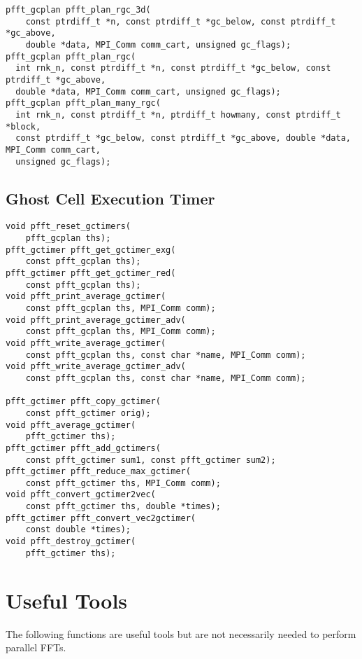 \begin{lstlisting}
pfft_gcplan pfft_plan_rgc_3d(
    const ptrdiff_t *n, const ptrdiff_t *gc_below, const ptrdiff_t *gc_above,
    double *data, MPI_Comm comm_cart, unsigned gc_flags);
pfft_gcplan pfft_plan_rgc(
  int rnk_n, const ptrdiff_t *n, const ptrdiff_t *gc_below, const ptrdiff_t *gc_above,
  double *data, MPI_Comm comm_cart, unsigned gc_flags);
pfft_gcplan pfft_plan_many_rgc(
  int rnk_n, const ptrdiff_t *n, ptrdiff_t howmany, const ptrdiff_t *block,
  const ptrdiff_t *gc_below, const ptrdiff_t *gc_above, double *data, MPI_Comm comm_cart,
  unsigned gc_flags);
\end{lstlisting}

\subsection{Ghost Cell Execution Timer}
\begin{lstlisting}
void pfft_reset_gctimers(
    pfft_gcplan ths);
pfft_gctimer pfft_get_gctimer_exg(
    const pfft_gcplan ths);
pfft_gctimer pfft_get_gctimer_red(
    const pfft_gcplan ths);
void pfft_print_average_gctimer(
    const pfft_gcplan ths, MPI_Comm comm);
void pfft_print_average_gctimer_adv(
    const pfft_gcplan ths, MPI_Comm comm);
void pfft_write_average_gctimer(
    const pfft_gcplan ths, const char *name, MPI_Comm comm);
void pfft_write_average_gctimer_adv(
    const pfft_gcplan ths, const char *name, MPI_Comm comm);

pfft_gctimer pfft_copy_gctimer(
    const pfft_gctimer orig);
void pfft_average_gctimer(
    pfft_gctimer ths);
pfft_gctimer pfft_add_gctimers(
    const pfft_gctimer sum1, const pfft_gctimer sum2);
pfft_gctimer pfft_reduce_max_gctimer(
    const pfft_gctimer ths, MPI_Comm comm);
void pfft_convert_gctimer2vec(
    const pfft_gctimer ths, double *times);
pfft_gctimer pfft_convert_vec2gctimer(
    const double *times);
void pfft_destroy_gctimer(
    pfft_gctimer ths);
\end{lstlisting}



\section{Useful Tools}
The following functions are useful tools but are not necessarily needed to perform parallel FFTs.

